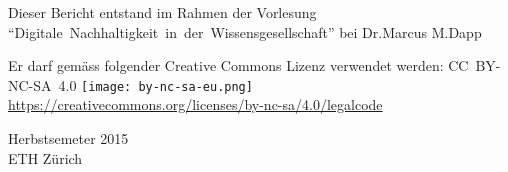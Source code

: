 \begin{titlepage}
\begin{large}
\begin{center}
			Dieser Bericht entstand im Rahmen der Vorlesung \mbox{``Digitale Nachhaltigkeit in der Wissensgesellschaft''} bei Dr.\@ Marcus M.\@ Dapp
			\vspace{2\baselineskip}
	
			Er darf gemäss folgender Creative Commons Lizenz verwendet werden: \mbox{CC BY-NC-SA 4.0} \texttt{[image: by-nc-sa-eu.png]}\\ \url{https://creativecommons.org/licenses/by-nc-sa/4.0/legalcode}
			\vfill
	
			Herbstsemeter 2015\\
			\vspace{0.5\baselineskip}
			ETH Zürich
		\end{center}
	\end{large}
\end{titlepage}